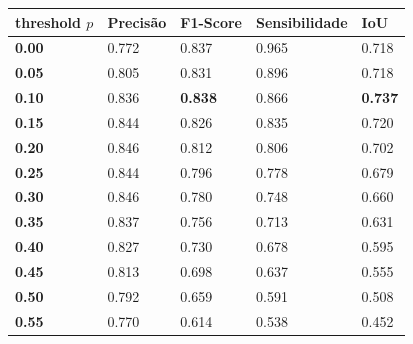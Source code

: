 \begin{table}[h]
\center
\begin{tiny}
\begin{tabular}{|l|l|l|l|l|}
\hline
\rowcolor[HTML]{C0C0C0} 
\textbf{threshold} $p$                    &  \textbf{Precisão}   & \textbf{F1-Score}         & \textbf{Sensibilidade}   & \textbf{IoU}     \\ \hline
\cellcolor[HTML]{EFEFEF}\textbf{0.00}   &  0.772               & 0.837                     & 0.965                    & 0.718            \\ \cline{1-5}
\cellcolor[HTML]{EFEFEF}\textbf{0.05}   &  0.805               & 0.831                     & 0.896                    & 0.718            \\ \cline{1-5}
\rowcolor[HTML]{D0D0D0} \textbf{0.10}   &  0.836               & \textbf{0.838}            & 0.866                    & \textbf{0.737}            \\ \cline{1-5}
\cellcolor[HTML]{EFEFEF}\textbf{0.15}   &  0.844               & 0.826                     & 0.835                    & 0.720            \\ \cline{1-5} 
\cellcolor[HTML]{EFEFEF}\textbf{0.20}   &  0.846               & 0.812                     & 0.806                    & 0.702            \\ \cline{1-5}
\cellcolor[HTML]{EFEFEF}\textbf{0.25}   &  0.844               & 0.796                     & 0.778                    & 0.679            \\ \cline{1-5}
\cellcolor[HTML]{EFEFEF}\textbf{0.30}   &  0.846               & 0.780                     & 0.748                    & 0.660            \\ \cline{1-5}
\cellcolor[HTML]{EFEFEF}\textbf{0.35}   &  0.837               & 0.756                     & 0.713                    & 0.631            \\ \cline{1-5} 
\cellcolor[HTML]{EFEFEF}\textbf{0.40}   &  0.827               & 0.730                     & 0.678                    & 0.595            \\ \cline{1-5}
\cellcolor[HTML]{EFEFEF}\textbf{0.45}   &  0.813               & 0.698                     & 0.637                    & 0.555            \\ \cline{1-5}
\cellcolor[HTML]{EFEFEF}\textbf{0.50}   &  0.792               & 0.659                     & 0.591                    & 0.508            \\ \cline{1-5}
\cellcolor[HTML]{EFEFEF}\textbf{0.55}   &  0.770               & 0.614                     & 0.538                    & 0.452            \\ \cline{1-5} 

\end{tabular}
\end{tiny}
\end{table}
